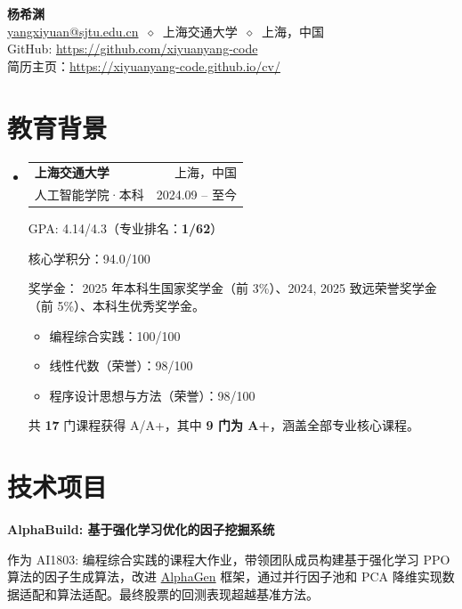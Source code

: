 \documentclass[letterpaper,11pt]{article}
\makeatletter
\newcommand{\cvheading}[4]{
  \vspace{-2pt}
  \item
  \begin{tabular*}{\textwidth}{l@{\extracolsep{\fill}}r}
    \textbf{#1} & #2 \\
    \small#3 & \small#4 \\
  \end{tabular*}
  \vspace{-7pt}
}
\newcommand{\cvheadingstart}{\begin{itemize}[leftmargin=0in, label={}]}
\newcommand{\cvheadingend}{\end{itemize}}
\makeatother
\begin{document}
\begin{center}
  {\LARGE\bfseries 杨希渊} \\
  \vspace{2pt}
  \href{mailto:yangxiyuan@sjtu.edu.cn}{yangxiyuan@sjtu.edu.cn}
  $\ \diamond\ $
  上海交通大学
  $\ \diamond\ $
  上海，中国
  \\
  GitHub: \href{https://github.com/xiyuanyang-code}{https://github.com/xiyuanyang-code}
  \\
  简历主页：\href{https://xiyuanyang-code.github.io/cv}{https://xiyuanyang-code.github.io/cv/}
\end{center}

\section{教育背景}
\cvheadingstart

\cvheading
{上海交通大学}{上海，中国}
{人工智能学院·本科}{2024.09 -- 至今}

GPA: 4.14/4.3（专业排名：\textbf{1/62}）

核心学积分：94.0/100

奖学金： 2025 年本科生国家奖学金（前 3\%）、2024, 2025 致远荣誉奖学金（前 5\%）、本科生优秀奖学金。

\begin{itemize}[nosep]
  \item 编程综合实践：100/100
  \item 线性代数（荣誉）：98/100
  \item 程序设计思想与方法（荣誉）：98/100
\end{itemize}

共 \textbf{17} 门课程获得 A/A+，其中 \textbf{9 门为 A+}，涵盖全部专业核心课程。

\cvheadingend

\section{技术项目}

\textbf{AlphaBuild: 基于强化学习优化的因子挖掘系统}

作为 AI1803: 编程综合实践的课程大作业，带领团队成员构建基于强化学习 PPO 算法的因子生成算法，改进 \href{https://github.com/RL-MLDM/alphagen}{AlphaGen} 框架，通过并行因子池和 PCA 降维实现数据适配和算法适配。最终股票的回测表现超越基准方法。

\medskip
\end{document}
